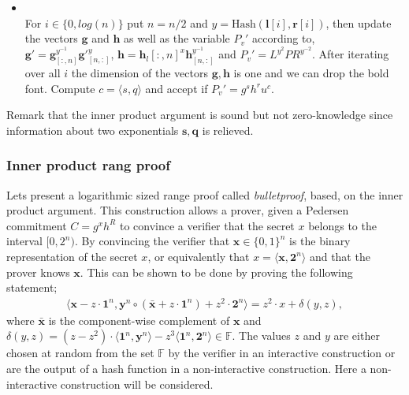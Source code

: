 \begin{algorithm}
\begin{itemize}
\begin{itemize}
\end{itemize}
\item{}\\
For $i\in\{0,log(n)\}$ put $n=n/2$ and $y=\text{Hash}(\bm{l}[i],\bm{r}[i])$, then update the vectors $\bm{g}$ and $\bm{h}$ as well as the  variable $P_v'$ according to, $\bm{g}'= \bm{g}_{[:,n]}^{y^{-1}}\bm{g}'_{[n,:]}^{y}$, $\bm{h}= \bm{h}_l{[:,n]}^{x}\bm{h}_{[n,:]}^{y^{-1}}$ and $ P_v' = L^{y^2}PR^{y^{-2}}  $. After iterating over all $i$ the dimension of the vectors $\bm{g},\bm{h}$ is one and we can drop the bold font. Compute  $c=\langle s, q\rangle$ and  accept if $P_v' =g^sh^ru^c$.
\end{itemize}
\label{alg:inner_product}
\end{algorithm}




 
Remark that the inner product argument is sound but not zero-knowledge since information about two exponentials $\mathbf{s},\mathbf{q}$ is relieved.

\subsubsection*{Inner product rang proof}
Lets present a logarithmic sized range proof called \textit{bulletproof}, based, on the inner product argument. This construction allows a prover, given a Pedersen commitment $C=g^x h^R$ to convince a verifier that the secret $x$ belongs to the interval $[0,2^n)$. By convincing the verifier that  $\bm{x}\in\{0,1\}^n$ is the binary representation of the secret $x$, or equivalently that $x= \langle \bm{x},\mathbf{2}^n\rangle $ and that the prover knows $\bm{x}$.
This can be shown to be done by proving the following statement;
\begin{align}
    \big\langle \bm{x} -z\cdot \bm{1}^n, \bm{y}^n\circ (\bm{\bar{x}} + z \cdot\bm{1}^n) + z^2\cdot\bm{2}^n \big\rangle = z^2\cdot x+ \delta(y,z),
    \label{eq:range_non_zero}
\end{align}
where $\bar{\bm{x}}$ is the component-wise complement of $\bm{x}$ and $\delta(y,z) = (z-z^2)\cdot\langle\bm{1}^n,\bm{y}^n\rangle-z^3\langle \bm{1}^n,\bm{2}^n\rangle\in\mathds{F}$.
The values $z$ and $y$ are either chosen at random from the set $\mathds{F}$ by the verifier in an interactive construction or are the output of a hash function in a non-interactive construction. Here a non-interactive construction will be considered. 

